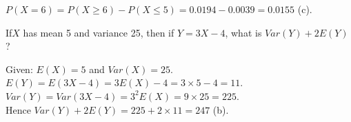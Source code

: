 \documentclass[bigtut]{tutorial}
\begin{document}
\begin{tutorial}
\begin{questions}
\begin{solution}
$P(X=6) = P(X \geq 6) - P(X \leq 5) = 0.0194 - 0.0039 = 0.0155$ (c).
\end{solution}


\question
If$X$ has mean 5 and variance 25, then if $Y=3X-4$, what is $Var(Y) + 2E(Y)$?
\begin{solution}
Given: $E(X)=5$ and $Var(X)=25$. \\
$E(Y) = E(3X-4) = 3E(X)-4 = 3 \times  5 - 4 = 11$. \\
$Var(Y) = Var(3X-4) = 3^2 E(X) = 9 \times  25  = 225$. \\
Hence $Var(Y) + 2E(Y) = 225 + 2 \times 11 = 247$ (b).
\end{solution}



\end{questions}
\end{tutorial}
\end{document}
